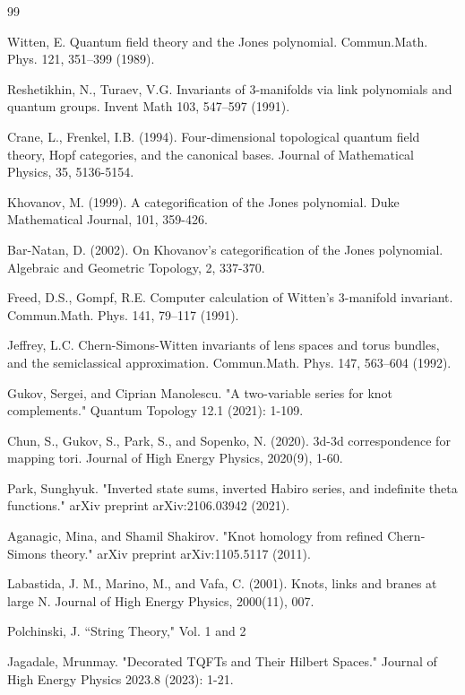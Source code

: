 \documentclass{article}
\numberwithin{corollary}{theorem}
\numberwithin{corollary}{proposition}
\begin{document}
\begin{thebibliography}{99}

Witten, E. Quantum field theory and the Jones polynomial. Commun.Math. Phys. 121, 351–399 (1989).

Reshetikhin, N., Turaev, V.G. Invariants of 3-manifolds via link polynomials and quantum groups. Invent Math 103, 547–597 (1991).

Crane, L., Frenkel, I.B. (1994). Four‐dimensional topological quantum field theory, Hopf categories, and the canonical bases. Journal of Mathematical Physics, 35, 5136-5154.

Khovanov, M. (1999). A categorification of the Jones polynomial. Duke Mathematical Journal, 101, 359-426.

Bar-Natan, D. (2002). On Khovanov’s categorification of the Jones polynomial. Algebraic and Geometric Topology, 2, 337-370.

Freed, D.S., Gompf, R.E. Computer calculation of Witten's 3-manifold invariant. Commun.Math. Phys. 141, 79–117 (1991).

 Jeffrey, L.C. Chern-Simons-Witten invariants of lens spaces and torus bundles, and the semiclassical approximation. Commun.Math. Phys. 147, 563–604 (1992). 

Gukov, Sergei, and Ciprian Manolescu. "A two-variable series for knot complements." Quantum Topology 12.1 (2021): 1-109.

Chun, S., Gukov, S., Park, S., and Sopenko, N. (2020). 3d-3d correspondence for mapping tori. Journal of High Energy Physics, 2020(9), 1-60.


Park, Sunghyuk. "Inverted state sums, inverted Habiro series, and indefinite theta functions." arXiv preprint arXiv:2106.03942 (2021).

Aganagic, Mina, and Shamil Shakirov. "Knot homology from refined Chern-Simons theory." arXiv preprint arXiv:1105.5117 (2011).

Labastida, J. M., Marino, M., and Vafa, C. (2001). Knots, links and branes at large N. Journal of High Energy Physics, 2000(11), 007.

Polchinski, J. ``String Theory," Vol. 1 and 2

Jagadale, Mrunmay. "Decorated TQFTs and Their Hilbert Spaces." Journal of High Energy Physics 2023.8 (2023): 1-21.


\end{thebibliography}
\end{document}
